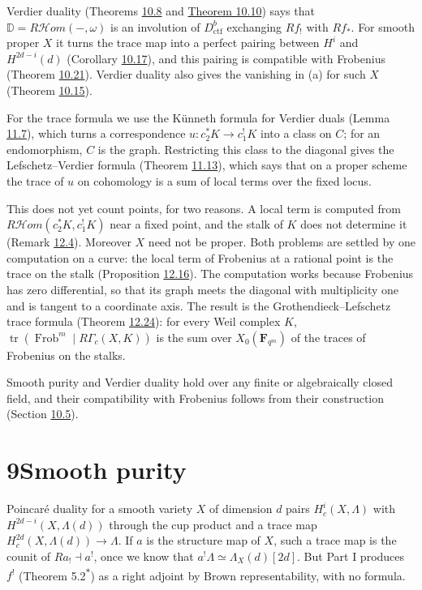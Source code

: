 \documentclass[11pt]{article}
\newcommand{\bpout}[1]{#1\textsuperscript{\hyperlink{bp-outside}{\ensuremath{\ast}}}}
\providecommand{\cHom}{}\renewcommand{\cHom}{R\mathcal{H}\!om}
\begin{document}
Verdier duality (Theorems \hyperref[bp125]{10.8} and \hyperref[bp132]{Theorem 10.10}) says that \(\mathbb D=\cHom(-,\omega)\) is an involution of \(D^b_{\mathrm{ctf}}\) exchanging \(Rf_!\) with \(Rf_*\). For smooth proper \(X\) it turns the trace map into a perfect pairing between \(H^i\) and \(H^{2d-i}(d)\) (Corollary \hyperref[bp152]{10.17}), and this pairing is compatible with Frobenius (Theorem \hyperref[bp165]{10.21}). Verdier duality also gives the vanishing in (a) for such \(X\) (Theorem \hyperref[bp146]{10.15}).

For the trace formula we use the Künneth formula for Verdier duals (Lemma \hyperref[bp191]{11.7}), which turns a correspondence \(u:c_2^*K\to c_1^!K\) into a class on \(C\); for an endomorphism, \(C\) is the graph. Restricting this class to the diagonal gives the Lefschetz–Verdier formula (Theorem \hyperref[bp206]{11.13}), which says that on a proper scheme the trace of \(u\) on cohomology is a sum of local terms over the fixed locus.

This does not yet count points, for two reasons. A local term is computed from \(\cHom(c_2^*K,c_1^!K)\) near a fixed point, and the stalk of \(K\) does not determine it (Remark \hyperref[bp239]{12.4}). Moreover \(X\) need not be proper. Both problems are settled by one computation on a curve: the local term of Frobenius at a rational point is the trace on the stalk (Proposition \hyperref[bp274]{12.16}). The computation works because Frobenius has zero differential, so that its graph meets the diagonal with multiplicity one and is tangent to a coordinate axis. The result is the Grothendieck–Lefschetz trace formula (Theorem \hyperref[bp298]{12.24}): for every Weil complex \(K\), \(\operatorname{tr}(\operatorname{Frob}^m\mid R\Gamma_c(X,K))\) is the sum over \(X_0(\mathbf F_{q^m})\) of the traces of Frobenius on the stalks.

Smooth purity and Verdier duality hold over any finite or algebraically closed field, and their compatibility with Frobenius follows from their construction (Section \hyperref[bp154]{10.5}).

\section*{\texorpdfstring{9\quad Smooth purity}{9 Smooth purity}}
\label{bp3}%
\label{bp4}%
Poincaré duality for a smooth variety \(X\) of dimension \(d\) pairs \(H^i_c(X,\Lambda)\) with \(H^{2d-i}(X,\Lambda(d))\) through the cup product and a trace map \(H^{2d}_c(X,\Lambda(d))\to\Lambda\). If \(a\) is the structure map of \(X\), such a trace map is the counit of \(Ra_!\dashv a^!\), once we know that \(a^!\Lambda\simeq\Lambda_X(d)[2d]\). But Part I produces \(f^!\) (Theorem \bpout{5.2}) as a right adjoint by Brown representability, with no formula.
\end{document}
